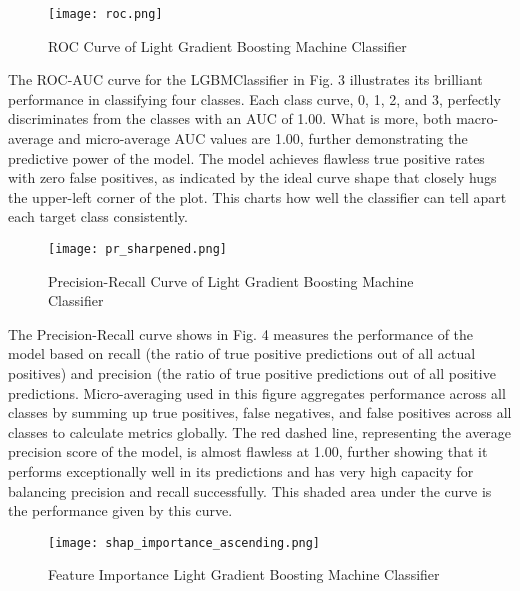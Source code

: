 \documentclass[conference]{IEEEtran}
\begin{document}
\begin{figure}[htbp]
    \vspace{0pt}
    \centering
    \texttt{[image: roc.png]}
    \vspace{0pt}
    \caption{ROC Curve of  Light Gradient Boosting Machine Classifier}
    \label{fig:workflow}
    \vspace{0pt}
\end{figure}

The ROC-AUC curve for the LGBMClassifier in Fig. 3 illustrates its brilliant performance in classifying four classes. Each class curve, 0, 1, 2, and 3, perfectly discriminates from the classes with an AUC of 1.00. What is more, both macro-average and micro-average AUC values are 1.00, further demonstrating the predictive power of the model. The model achieves flawless true positive rates with zero false positives, as indicated by the ideal curve shape that closely hugs the upper-left corner of the plot. This charts how well the classifier can tell apart each target class consistently.

\begin{figure}[htbp]
    \vspace{0pt}
    \centering
    \texttt{[image: pr\_sharpened.png]}
    \vspace{0pt}
    \caption{Precision-Recall Curve of  Light Gradient Boosting Machine Classifier}
    \label{fig:workflow}
    \vspace{0pt}
\end{figure}

The Precision-Recall curve shows in Fig. 4 measures the performance of the model based on recall (the ratio of true positive predictions out of all actual positives) and precision (the ratio of true positive predictions out of all positive predictions. Micro-averaging used in this figure aggregates performance across all classes by summing up true positives, false negatives, and false positives across all classes to calculate metrics globally. The red dashed line, representing the average precision score of the model, is almost flawless at 1.00, further showing that it performs exceptionally well in its predictions and has very high capacity for balancing precision and recall successfully. This shaded area under the curve is the performance given by this curve.

\begin{figure}[htbp]
    \vspace{0pt}
    \centering
    \texttt{[image: shap\_importance\_ascending.png]}
    \vspace{0pt}
    \caption{Feature Importance Light Gradient Boosting Machine Classifier}
    \label{fig:workflow}
    \vspace{0pt}
\end{figure}
\end{document}
